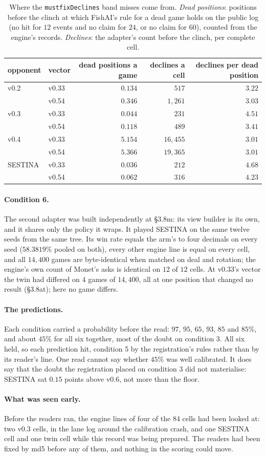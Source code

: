 \documentclass[11pt]{article}
\newcommand{\code}[1]{\texttt{#1}}
\newcommand{\sect}[1]{\S#1}
\newcommand{\VCsixPara}{The second adapter was built independently at \sect{3.8m}: its view builder is its own, and it shares only the policy it wraps. It played SESTINA on the same twelve seeds from the same tree. Its win rate equals the arm's to four decimals on every seed ($58.3819\%$ pooled on both), every other engine line is equal on every cell, and all $14{,}400$ games are byte-identical when matched on deal and rotation; the engine's own count of Monet's asks is identical on $12$ of $12$ cells. At v0.33's vector the twin had differed on $4$ games of $14{,}400$, all at one position that changed no result (\sect{3.8at}); here no game differs.}
\newcommand{\VPredScore}{All six held, so each prediction hit, condition 5 by the registration's rules rather than by its reader's line. One read cannot say whether $45\%$ was well calibrated. It does say that the doubt the registration placed on condition 3 did not materialise: SESTINA sat $0.15$ points above v0.6, not more than the floor.}
\begin{document}
\begin{table}[t]
\centering
\small
\caption{Where the \code{mustfixDeclines} band misses come from. \emph{Dead positions}: positions before
the clinch at which FishAI's rule for a dead game holds on the public log (no hit for $12$ events and
no claim for $24$, or no claim for $60$), counted from the engine's records. \emph{Declines}: the
adapter's count before the clinch, per complete cell.}
\label{tab:located}
\begin{tabular}{@{}llrrr@{}}
\toprule
opponent & vector & dead positions a game & declines a cell & declines per dead position \\
\midrule
v0.2    & v0.33 & $0.134$ & $517$    & $3.22$ \\
        & v0.54 & $0.346$ & $1{,}261$ & $3.03$ \\
v0.3    & v0.33 & $0.044$ & $231$    & $4.51$ \\
        & v0.54 & $0.118$ & $489$    & $3.41$ \\
v0.4    & v0.33 & $5.154$ & $16{,}455$ & $3.01$ \\
        & v0.54 & $5.366$ & $19{,}365$ & $3.01$ \\
SESTINA & v0.33 & $0.036$ & $212$    & $4.68$ \\
        & v0.54 & $0.062$ & $316$    & $4.23$ \\
\bottomrule
\end{tabular}
\end{table}

\paragraph{Condition 6.} \VCsixPara

\paragraph{The predictions.} Each condition carried a probability before the read: $97$, $95$, $65$,
$93$, $85$ and $85\%$, and about $45\%$ for all six together, most of the doubt on condition 3.
\VPredScore

\paragraph{What was seen early.} Before the readers ran, the engine lines of four of the $84$ cells had
been looked at: two v0.3 cells, in the lane log around the calibration crash, and one SESTINA cell and
one twin cell while this record was being prepared. The readers had been fixed by md5 before any of
them, and nothing in the scoring could move.
\end{document}
